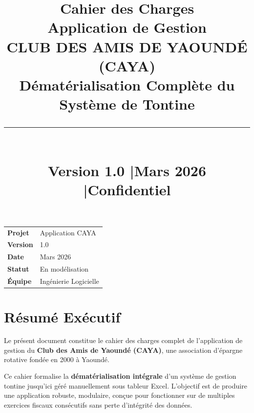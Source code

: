 \documentclass[12pt, a4paper]{report}
\title{%
  \vspace{-1cm}
  {\Huge\bfseries\color{cayaBlue} Cahier des Charges}\\[0.4cm]
  {\large\bfseries Application de Gestion\\[0.1cm]
  \textbf{\color{cayaGold}CLUB DES AMIS DE YAOUNDÉ (CAYA)}}\\[0.3cm]
  {\normalsize Dématérialisation Complète du Système de Tontine}\\[0.5cm]
  \rule{0.6\textwidth}{1pt}\\[0.4cm]
  {\small Version 1.0 \quad|\quad Mars 2026 \quad|\quad Confidentiel}
}
\author{}
\date{}
\begin{document}

\maketitle
\thispagestyle{empty}

\vfill
\begin{center}
  \begin{tabular}{ll}
    \toprule
    \textbf{Projet}    & Application CAYA \\
    \textbf{Version}   & 1.0 \\
    \textbf{Date}      & Mars 2026 \\
    \textbf{Statut}    & En modélisation \\
    \textbf{Équipe}    & Ingénierie Logicielle \\
    \bottomrule
  \end{tabular}
\end{center}

\newpage
\tableofcontents
\newpage

\chapter*{Résumé Exécutif}

Le présent document constitue le cahier des charges complet de l'application de gestion du
\textbf{Club des Amis de Yaoundé (CAYA)}, une association d'épargne rotative fondée en 2000 à Yaoundé.

\medskip
Ce cahier formalise la \textbf{dématérialisation intégrale} d'un système de gestion tontine jusqu'ici
géré manuellement sous tableur Excel. L'objectif est de produire une application robuste, modulaire,
conçue pour fonctionner sur de multiples exercices fiscaux consécutifs sans perte d'intégrité des données.
\end{document}
